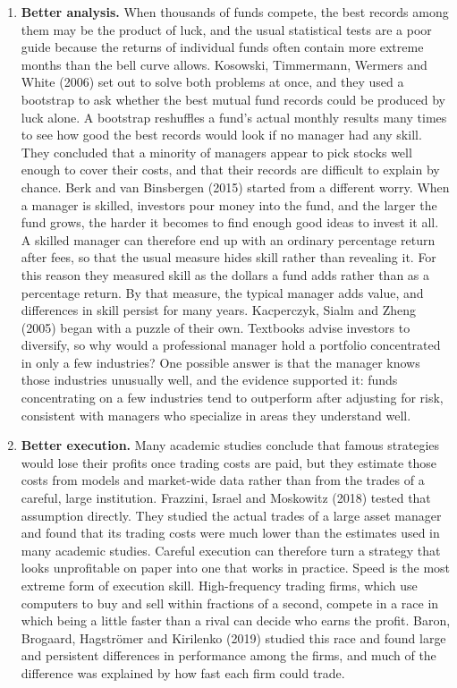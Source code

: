 \begin{itemize}
\begin{enumerate}
    \item \textbf{Better analysis.} When thousands of funds compete, the best
  records among them may be the product of luck, and the usual statistical
  tests are a poor guide because the returns of individual funds often
  contain more extreme months than the bell curve allows. Kosowski,
  Timmermann, Wermers and White (2006) set out to solve both problems at once,
  and they used a bootstrap to ask whether the best mutual
  fund records could be produced by luck alone. A bootstrap reshuffles a fund's actual monthly
  results many times to see how good the best records would look if no
  manager had any skill. They concluded that a minority of managers appear
  to pick stocks well enough to cover their costs, and that their records are
  difficult to explain by chance. Berk and van Binsbergen (2015) started from
  a different worry. When a manager is skilled, investors pour money into the
  fund, and the larger the fund grows, the harder it becomes to find enough
  good ideas to invest it all. A skilled manager can therefore end up with an
  ordinary percentage return after fees, so that the usual measure hides
  skill rather than revealing it. For this reason they measured skill as the
  dollars a fund adds rather than as a percentage return. By that measure,
  the typical manager adds value, and differences in skill persist for many
  years. Kacperczyk, Sialm and Zheng (2005) began with a puzzle of their own.
  Textbooks advise investors to diversify, so why would a professional
  manager hold a portfolio concentrated in only a few industries? One
  possible answer is that the manager knows those industries unusually well,
  and the evidence supported it: funds concentrating on a few industries tend
  to outperform after adjusting for risk, consistent with managers who
  specialize in areas they understand well.

    \item \textbf{Better execution.} Many academic studies conclude that famous
  strategies would lose their profits once trading costs are paid, but they
  estimate those costs from models and market-wide data rather than from the
  trades of a careful, large institution. Frazzini, Israel and Moskowitz
  (2018) tested that assumption directly. They studied the actual trades of a
  large asset manager and found that its trading costs were much lower than
  the estimates used in many academic studies. Careful execution can
  therefore turn a strategy that looks unprofitable on paper into one that
  works in practice. Speed is the most extreme form of execution skill.
  High-frequency trading firms, which use computers to buy and sell within
  fractions of a second, compete in a race in which being a little faster
  than a rival can decide who earns the profit. Baron, Brogaard,
  Hagstr\"om{}er and Kirilenko (2019) studied this race and found large and
  persistent differences in performance among the firms, and much of the
  difference was explained by how fast each firm could trade.
  

\end{enumerate}
\end{itemize}
